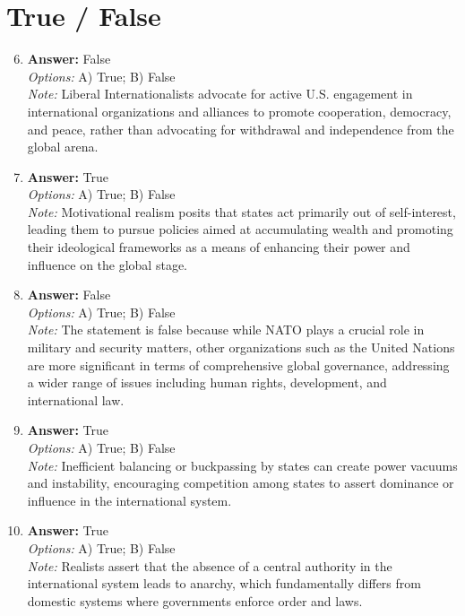 \documentclass[12pt]{article}
\begin{document}
\section*{True / False}
\begin{enumerate}[label=\arabic*.]
\setcounter{enumi}{5}
\item \textbf{Answer:} False
\\ \textit{Options:} A) True; B) False
\\ \textit{Note:} Liberal Internationalists advocate for active U.S. engagement in international organizations and alliances to promote cooperation, democracy, and peace, rather than advocating for withdrawal and independence from the global arena.
\item \textbf{Answer:} True
\\ \textit{Options:} A) True; B) False
\\ \textit{Note:} Motivational realism posits that states act primarily out of self-interest, leading them to pursue policies aimed at accumulating wealth and promoting their ideological frameworks as a means of enhancing their power and influence on the global stage.
\item \textbf{Answer:} False
\\ \textit{Options:} A) True; B) False
\\ \textit{Note:} The statement is false because while NATO plays a crucial role in military and security matters, other organizations such as the United Nations are more significant in terms of comprehensive global governance, addressing a wider range of issues including human rights, development, and international law.
\item \textbf{Answer:} True
\\ \textit{Options:} A) True; B) False
\\ \textit{Note:} Inefficient balancing or buckpassing by states can create power vacuums and instability, encouraging competition among states to assert dominance or influence in the international system.
\item \textbf{Answer:} True
\\ \textit{Options:} A) True; B) False
\\ \textit{Note:} Realists assert that the absence of a central authority in the international system leads to anarchy, which fundamentally differs from domestic systems where governments enforce order and laws.
\end{enumerate}
\end{document}
